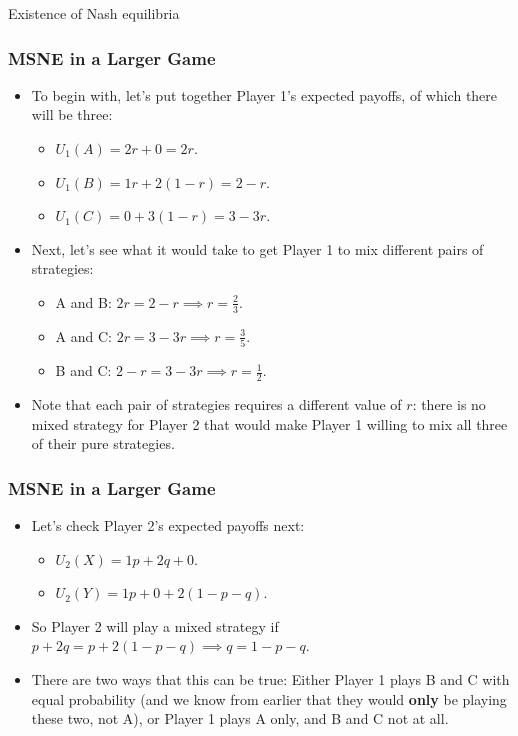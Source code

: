 \begin{frame}{Existence of Nash equilibria}
\frametitle{MSNE in a Larger Game}
\begin{itemize}
	\item To begin with, let's put together Player 1's expected payoffs, of which there will be three:
	\begin{itemize}
		\item $U_1(A) = 2r + 0 = 2r$.
		\item $U_1(B) = 1r + 2(1 - r) = 2 - r$.
		\item $U_1(C) = 0 + 3(1 - r) = 3 - 3r$.
	\end{itemize}
	\item Next, let's see what it would take to get Player 1 to mix different pairs of strategies:
	\begin{itemize}
		\item A and B: $2r = 2 - r \implies r = \frac{2}{3}$.
		\item A and C: $2r = 3 - 3r \implies r = \frac{3}{5}$.
		\item B and C: $2 - r = 3 - 3r \implies r = \frac{1}{2}$.
	\end{itemize}
	\item Note that each pair of strategies requires a different value of $r$: there is no mixed strategy for Player 2 that would make Player 1 willing to mix all three of their pure strategies.
\end{itemize}
\end{frame}

\begin{frame}
\frametitle{MSNE in a Larger Game}
\begin{itemize}
	\item Let's check Player 2's expected payoffs next:
	\begin{itemize}
		\item $U_2(X) = 1p + 2q + 0$.
		\item $U_2(Y) = 1p + 0 + 2(1 - p - q)$.
	\end{itemize}
	\item So Player 2 will play a mixed strategy if $p + 2q = p + 2(1 - p - q) \implies q = 1 - p - q$.
	\item There are two ways that this can be true: Either Player 1 plays B and C with equal probability (and we know from earlier that they would \textbf{only} be playing these two, not A), or Player 1 plays A only, and B and C not at all. 
\end{itemize}
\end{frame}

